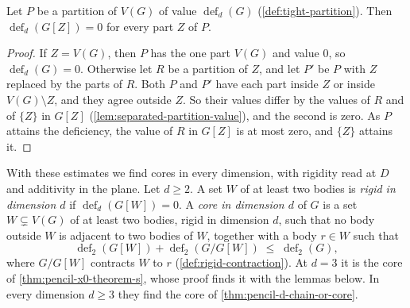 \begin{lemma}
  \label{lem:deficiency-tight-part}
  \leanok
  Let $P$ be a partition of $V(G)$ of value
  $\operatorname{def}_d(G)$ (\cref{def:tight-partition}). Then
  $\operatorname{def}_d(G[Z]) = 0$ for every part $Z$ of $P$.
\end{lemma}
\begin{proof}
  \leanok
  If $Z = V(G)$, then $P$ has the one part $V(G)$ and value $0$, so
  $\operatorname{def}_d(G) = 0$. Otherwise let $R$ be a partition of
  $Z$, and let $P'$ be $P$ with $Z$ replaced by the parts of $R$. Both
  $P$ and $P'$ have each part inside $Z$ or inside $V(G) \setminus Z$,
  and they agree outside $Z$. So their values differ by the values of
  $R$ and of $\{Z\}$ in $G[Z]$ (\cref{lem:separated-partition-value}),
  and the second is zero. As $P$ attains the deficiency, the value of
  $R$ in $G[Z]$ is at most zero, and $\{Z\}$ attains it.
\end{proof}

With these estimates we find cores in every dimension, with rigidity
read at $D$ and additivity in the plane. Let $d \ge 2$. A set
$W$ of at least two bodies is \emph{rigid in dimension $d$} if
$\operatorname{def}_d(G[W]) = 0$. A \emph{core in dimension $d$} of $G$
is a set $W \subsetneq V(G)$ of at least two bodies, rigid in dimension
$d$, such that no body outside $W$ is adjacent to two bodies of $W$,
together with a body $r \in W$ such that
\[
  \operatorname{def}_2(G[W]) + \operatorname{def}_2(G/G[W]) \;\le\;
  \operatorname{def}_2(G),
\]
where $G/G[W]$ contracts $W$ to $r$ (\cref{def:rigid-contraction}). At
$d = 3$ it is the core of \cref{thm:pencil-x0-theorem-s}, whose proof
finds it with the lemmas below. In every dimension $d \ge 3$ they find
the core of \cref{thm:pencil-d-chain-or-core}.

